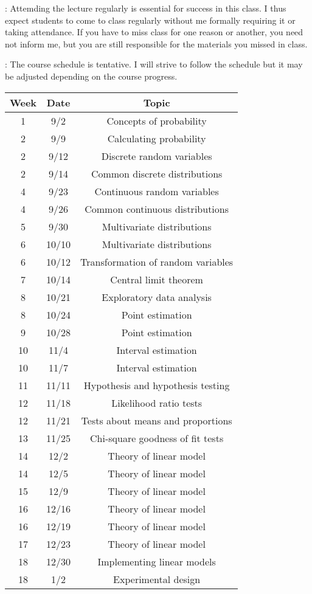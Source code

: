 \documentclass[12pt]{article}
\begin{document}
:
Attemding the lecture regularly is essential for success in this class. I thus expect students to come to class regularly without me formally requiring it or taking attendance. If you have to miss class for one reason or another, you need not inform me, but you are still responsible for the materials you missed in class.
\medskip


\newpage

: The course schedule is tentative. I will strive to follow the schedule but it may be adjusted depending on the course progress.

\begin{center}
\begin{tabular}{ccc}
\hline
Week&Date	&Topic \\
\hline
1	&9/2		&Concepts of probability \\
2	&9/9		&Calculating probability \\	
2	&9/12	&Discrete random variables \\
2	&9/14	&Common discrete distributions\\	
4	&9/23	&Continuous random variables \\
4	&9/26	&Common continuous distributions\\
5	&9/30	&Multivariate distributions \\
6	&10/10	&Multivariate distributions \\
6	&10/12	&Transformation of random variables\\
7	&10/14	&Central limit theorem \\
8	&10/21	&Exploratory data analysis \\
8	&10/24	&Point estimation\\
9	&10/28	&Point estimation \\
10	&11/4	&Interval estimation\\
10	&11/7	&Interval estimation \\
11	&11/11	&Hypothesis and hypothesis testing \\ 
12	&11/18	&Likelihood ratio tests \\
12	&11/21	&Tests about means and proportions \\
13	&11/25	&Chi-square goodness of fit tests \\
14	&12/2	&Theory of linear model \\
14	&12/5	&Theory of linear model \\
15	&12/9	&Theory of linear model \\
16	&12/16	&Theory of linear model \\
16	&12/19	&Theory of linear model \\
17	&12/23	&Theory of linear model \\
18	&12/30	&Implementing linear models \\
18	&1/2		&Experimental design \\
\hline

\end{tabular}
\end{center}
\end{document}
